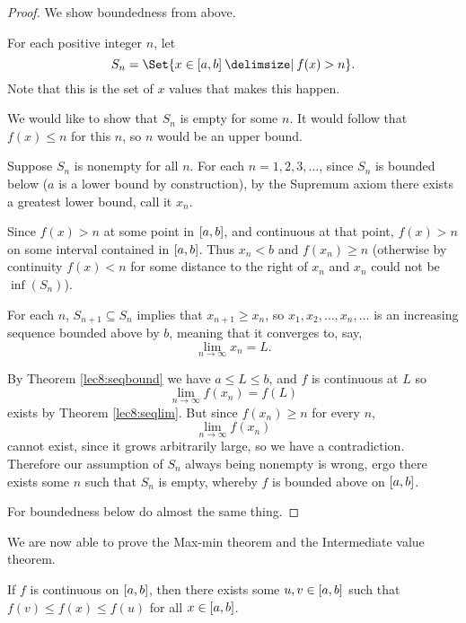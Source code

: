 \begin{proof}
	We show boundedness from above.

	For each positive integer $n$, let
	\[
		S_n = \Set{x \in \interval{a}{b} \given f(x) > n}.
	\]
	Note that this is the set of $x$ values that makes this happen.

	We would like to show that $S_n$ is empty for some $n$.
	It would follow that $f(x) \leq n$ for this $n$, so $n$ would be an upper bound.

	Suppose $S_n$ is nonempty for all $n$.
	For each $n = 1, 2, 3, \ldots$, since $S_n$ is bounded below ($a$ is a lower bound by construction), by the Supremum axiom there exists a greatest lower bound, call it $x_n$.

	Since $f(x) > n$ at some point in $\interval{a}{b}$, and continuous at that point, $f(x) > n$ on some interval contained in $\interval{a}{b}$.
	Thus $x_n < b$ and $f(x_n) \geq n$ (otherwise by continuity $f(x) < n$ for some distance to the right of $x_n$ and $x_n$ could not be $\inf(S_n)$).

	For each $n$, $S_{n + 1} \subseteq S_n$ implies that $x_{n + 1} \geq x_n$, so $x_1, x_2, \ldots, x_n, \ldots$ is an increasing sequence bounded above by $b$, meaning that it converges to, say,
	\[
		\lim_{n \to \infty} x_n = L.
	\]

	\noindent
	By Theorem \ref{lec8:seqbound} we have $a \leq L \leq b$, and $f$ is continuous at $L$ so
	\[
		\lim_{n \to \infty} f(x_n) = f(L)
	\]
	exists by Theorem \ref{lec8:seqlim}.
	But since $f(x_n) \geq n$ for every $n$,
	\[
		\lim_{n \to \infty} f(x_n)
	\]
	cannot exist, since it grows arbitrarily large, so we have a contradiction.
	Therefore our assumption of $S_n$ always being nonempty is wrong, ergo there exists some $n$ such that $S_n$ is empty, whereby $f$ is bounded above on $\interval{a}{b}$.

	For boundedness below do almost the same thing.
\end{proof}

\noindent
We are now able to prove the Max-min theorem and the Intermediate value theorem.

\begin{theorem}
	If $f$ is continuous on $\interval{a}{b}$, then there exists some $u, v \in \interval{a}{b}$ such that $f(v) \leq f(x) \leq f(u)$ for all $x \in \interval{a}{b}$.
\end{theorem}

